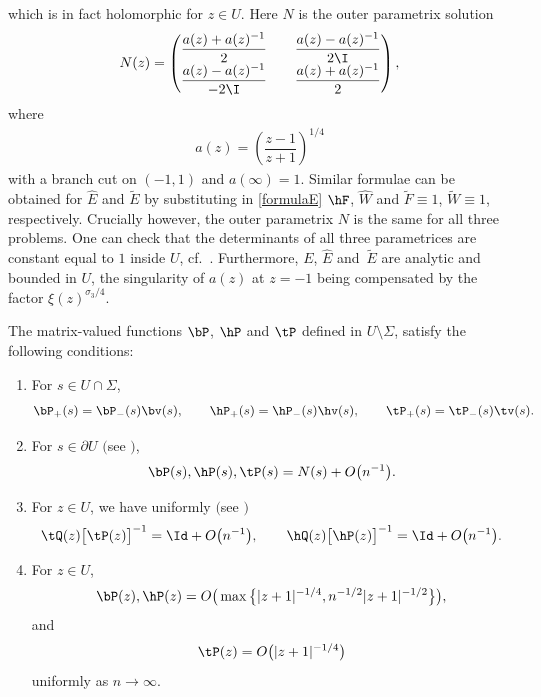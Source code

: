 which is in fact holomorphic for $z \in U$.
 Here $N$ is the outer parametrix solution
 \begin{align}\label{OuterParametrix}
 N(z) = \begin{pmatrix}
\dfrac{a(z)+a(z)^{-1}}{2} && \dfrac{a(z)- a(z)^{-1}}{2\I}
\\
\dfrac{a(z)- a(z)^{-1}}{-2\I} && \dfrac{a(z)+a(z)^{-1}}{2}
\end{pmatrix},
\end{align}
where
\begin{align*}
a(z) = \left( \dfrac{z-1}{z+1} \right)^{1/4}
\end{align*}
with a branch cut on $(-1,1)$ and $a(\infty) = 1$. Similar formulae can be obtained for $\widehat E$ and $\widetilde E$ by substituting in \eqref{formulaE} $\hF$, $\widehat W$ and $\widetilde F \equiv 1$, $\widetilde W \equiv 1$, respectively. Crucially however, the outer parametrix $N$ is the same for all three problems. One can check that the determinants of all three parametrices are constant equal to $1$ inside $U$, cf.\ \cite[Section~7]{KMVV}. Furthermore, $E$, $\widehat E$ and~$\widetilde E$ are analytic and bounded in $U$, the singularity of $a(z)$ at $z =-1$ being compensated by the factor $\xi(z)^{\sigma_3/4}$.
\begin{Lemma}\label{PropP}
The matrix-valued functions $\bP$, $\hP$ and $\tP$ defined in $U \setminus \Sigma$, satisfy the following conditions:
\begin{enumerate}[$(i)$]\itemsep=0pt
 \item For $s \in U\cap \Sigma$,
 \begin{align} \label{ParametrixJump}
 \bP_+(s) = \bP_-(s) \bv(s), \qquad
 \hP_+(s) = \hP_-(s) \hv(s), \qquad
 \tP_+(s) = \tP_-(s) \tv(s).
 \end{align}
 \item For $s \in \partial U$ $($see \emph{\cite[equation~(6.41)]{KMVV}}$)$,
 \begin{align}\label{ParaMatchingCond}
 \bP(s), \hP(s), \tP(s) = N(s) + O\big(n^{-1}\big).
 \end{align}
\item For $z \in U$, we have uniformly $($see \emph{\cite[equation~(7.10)]{KMVV}}$)$
\begin{align} \label{ParaConv}
 \tQ(z) \big[\tP(z)\big]^{-1} = \Id + O\big(n^{-1}\big), \qquad \hQ(z) \big[\hP(z)\big]^{-1} = \Id + O\big(n^{-1}\big).
\end{align}
\item For $z \in U$,
\begin{align}\label{ParaBehaviour}
 \bP(z), \hP(z) = O\big(\max\big\lbrace |z+1|^{-1/4}, n^{-1/2} |z+1|^{-1/2}\big\rbrace\big),
\end{align}
and
\begin{align}\label{LegendreBehaviour}
 \tP(z) = O\big(|z+1|^{-1/4}\big)
\end{align}
uniformly as $n \to \infty$.
\end{enumerate}
\end{Lemma}
